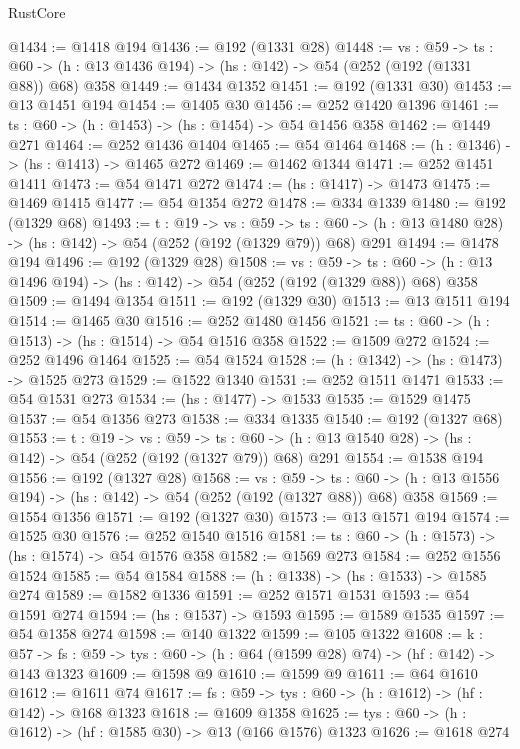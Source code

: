 \begin{lexlean}{RustCore}
\begin{coremodule}
@1434 := @1418 @194
@1436 := @192 (@1331 @28)
@1448 := {vs : @59} ->
  {ts : @60} -> (h : @13 @1436 @194) -> (hs : @142) -> @54 (@252 (@192 (@1331 @88)) @68) @358
@1449 := @1434 @1352
@1451 := @192 (@1331 @30)
@1453 := @13 @1451 @194
@1454 := @1405 @30
@1456 := @252 @1420 @1396
@1461 := {ts : @60} -> (h : @1453) -> (hs : @1454) -> @54 @1456 @358
@1462 := @1449 @271
@1464 := @252 @1436 @1404
@1465 := @54 @1464
@1468 := (h : @1346) -> (hs : @1413) -> @1465 @272
@1469 := @1462 @1344
@1471 := @252 @1451 @1411
@1473 := @54 @1471 @272
@1474 := (hs : @1417) -> @1473
@1475 := @1469 @1415
@1477 := @54 @1354 @272
@1478 := @334 @1339
@1480 := @192 (@1329 @68)
@1493 := {t : @19} ->
  {vs : @59} ->
  {ts : @60} -> (h : @13 @1480 @28) -> (hs : @142) -> @54 (@252 (@192 (@1329 @79)) @68) @291
@1494 := @1478 @194
@1496 := @192 (@1329 @28)
@1508 := {vs : @59} ->
  {ts : @60} -> (h : @13 @1496 @194) -> (hs : @142) -> @54 (@252 (@192 (@1329 @88)) @68) @358
@1509 := @1494 @1354
@1511 := @192 (@1329 @30)
@1513 := @13 @1511 @194
@1514 := @1465 @30
@1516 := @252 @1480 @1456
@1521 := {ts : @60} -> (h : @1513) -> (hs : @1514) -> @54 @1516 @358
@1522 := @1509 @272
@1524 := @252 @1496 @1464
@1525 := @54 @1524
@1528 := (h : @1342) -> (hs : @1473) -> @1525 @273
@1529 := @1522 @1340
@1531 := @252 @1511 @1471
@1533 := @54 @1531 @273
@1534 := (hs : @1477) -> @1533
@1535 := @1529 @1475
@1537 := @54 @1356 @273
@1538 := @334 @1335
@1540 := @192 (@1327 @68)
@1553 := {t : @19} ->
  {vs : @59} ->
  {ts : @60} -> (h : @13 @1540 @28) -> (hs : @142) -> @54 (@252 (@192 (@1327 @79)) @68) @291
@1554 := @1538 @194
@1556 := @192 (@1327 @28)
@1568 := {vs : @59} ->
  {ts : @60} -> (h : @13 @1556 @194) -> (hs : @142) -> @54 (@252 (@192 (@1327 @88)) @68) @358
@1569 := @1554 @1356
@1571 := @192 (@1327 @30)
@1573 := @13 @1571 @194
@1574 := @1525 @30
@1576 := @252 @1540 @1516
@1581 := {ts : @60} -> (h : @1573) -> (hs : @1574) -> @54 @1576 @358
@1582 := @1569 @273
@1584 := @252 @1556 @1524
@1585 := @54 @1584
@1588 := (h : @1338) -> (hs : @1533) -> @1585 @274
@1589 := @1582 @1336
@1591 := @252 @1571 @1531
@1593 := @54 @1591 @274
@1594 := (hs : @1537) -> @1593
@1595 := @1589 @1535
@1597 := @54 @1358 @274
@1598 := @140 @1322
@1599 := @105 @1322
@1608 := {k : @57} ->
  {fs : @59} -> {tys : @60} -> (h : @64 (@1599 @28) @74) -> (hf : @142) -> @143 @1323
@1609 := @1598 @9
@1610 := @1599 @9
@1611 := @64 @1610
@1612 := @1611 @74
@1617 := {fs : @59} -> {tys : @60} -> (h : @1612) -> (hf : @142) -> @168 @1323
@1618 := @1609 @1358
@1625 := {tys : @60} -> (h : @1612) -> (hf : @1585 @30) -> @13 (@166 @1576) @1323
@1626 := @1618 @274

\end{coremodule}
\end{lexlean}
